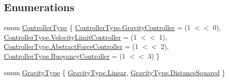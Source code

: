 \subsection*{Enumerations}
\begin{DoxyCompactItemize}
\item 
enum \hyperlink{namespace_farseer_physics_1_1_controllers_a0b34b986191b1dd53a0a4169d1add7c7}{Controller\+Type} \{ \hyperlink{namespace_farseer_physics_1_1_controllers_a0b34b986191b1dd53a0a4169d1add7c7af240b1c17d5df9a9776a8a16e371047f}{Controller\+Type.\+Gravity\+Controller} = (1 $<$$<$ 0), 
\hyperlink{namespace_farseer_physics_1_1_controllers_a0b34b986191b1dd53a0a4169d1add7c7a0ac198fbe8b5d46b2f4928b21f0f5b4c}{Controller\+Type.\+Velocity\+Limit\+Controller} = (1 $<$$<$ 1), 
\hyperlink{namespace_farseer_physics_1_1_controllers_a0b34b986191b1dd53a0a4169d1add7c7ae7893f06d71650854a394854a72a9fa5}{Controller\+Type.\+Abstract\+Force\+Controller} = (1 $<$$<$ 2), 
\hyperlink{namespace_farseer_physics_1_1_controllers_a0b34b986191b1dd53a0a4169d1add7c7ab93140d2bf725083afb6cc01133527c4}{Controller\+Type.\+Buoyancy\+Controller} = (1 $<$$<$ 3)
 \}
\item 
enum \hyperlink{namespace_farseer_physics_1_1_controllers_a0780c40c19c557616e5ce1d531d1a78c}{Gravity\+Type} \{ \hyperlink{namespace_farseer_physics_1_1_controllers_a0780c40c19c557616e5ce1d531d1a78ca32a843da6ea40ab3b17a3421ccdf671b}{Gravity\+Type.\+Linear}, 
\hyperlink{namespace_farseer_physics_1_1_controllers_a0780c40c19c557616e5ce1d531d1a78cab5950247badd257aa18269aa0e183c6a}{Gravity\+Type.\+Distance\+Squared}
 \}
\end{DoxyCompactItemize}


